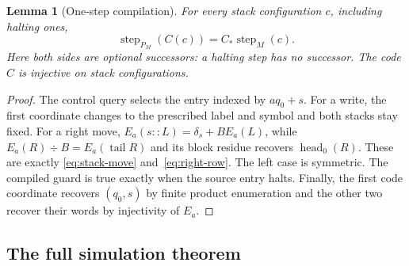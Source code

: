 \documentclass[11pt]{article}
\numberwithin{equation}{section}
\newtheorem{lemma}[theorem]{Lemma}
\theoremstyle{definition}
\theoremstyle{remark}
\newcommand{\step}{\operatorname{step}}
\begin{document}
\begin{lemma}[One-step compilation]\label{lem:one-step}
For every stack configuration $c$, including halting ones,
\begin{equation}\label{eq:compiler-step}
 \step_{P_M}(C(c))=C_*\step_M(c).
\end{equation}
Here both sides are optional successors: a halting step has no successor.
The code $C$ is injective on stack configurations.
\end{lemma}
\begin{proof}
The control query selects the entry indexed by $aq_0+s$.
For a write, the first coordinate changes to the prescribed label and
symbol and both stacks stay fixed. For a right move,
$E_a(s::L)=\delta_s+BE_a(L)$, while
$E_a(R)\div B=E_a(\operatorname{tail}R)$ and its block residue
recovers $\operatorname{head}_0(R)$. These are exactly
\eqref{eq:stack-move} and~\eqref{eq:right-row}. The left case is
symmetric. The compiled guard is true exactly when the source entry
halts. Finally, the first code coordinate recovers $(q_0,s)$ by finite
product enumeration and the other two recover their words by
injectivity of $E_a$.
\end{proof}

\subsection{The full simulation theorem}
\end{document}
